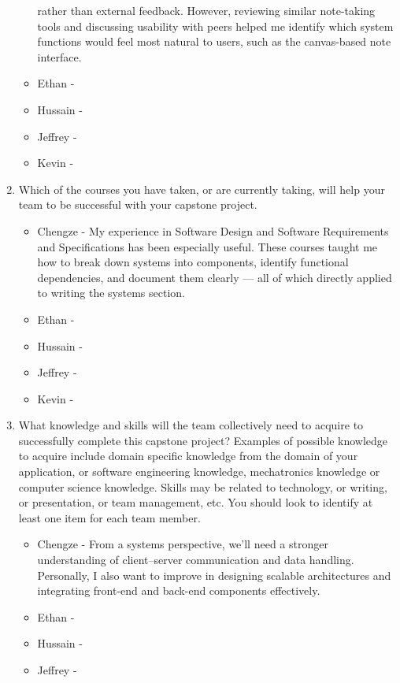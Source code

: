 \begin{enumerate}
\begin{itemize}
        rather than external feedback. However, reviewing similar note-taking tools 
        and discussing usability with peers helped me identify which system functions 
        would feel most natural to users, such as the canvas-based note interface.
        \item Ethan - 
        \item Hussain - 
        \item Jeffrey - 
        \item Kevin - 
  \end{itemize} 
  \item Which of the courses you have taken, or are currently taking, will help
  your team to be successful with your capstone project.
  \begin{itemize}
        \item Chengze - My experience in Software Design and Software Requirements 
        and Specifications has been especially useful. These courses taught me how 
        to break down systems into components, identify functional dependencies, and 
        document them clearly — all of which directly applied to writing the systems section.
        \item Ethan - 
        \item Hussain - 
        \item Jeffrey - 
        \item Kevin - 
  \end{itemize} 
  \item What knowledge and skills will the team collectively need to acquire to
  successfully complete this capstone project?  Examples of possible knowledge
  to acquire include domain specific knowledge from the domain of your
  application, or software engineering knowledge, mechatronics knowledge or
  computer science knowledge.  Skills may be related to technology, or writing,
  or presentation, or team management, etc.  You should look to identify at
  least one item for each team member.
  \begin{itemize}
        \item Chengze - From a systems perspective, we’ll need a stronger understanding 
        of client–server communication and data handling. Personally, I also want to 
        improve in designing scalable architectures and integrating front-end and back-end 
        components effectively.
        \item Ethan - 
        \item Hussain - 
        \item Jeffrey - 

\end{itemize}
\end{enumerate}
